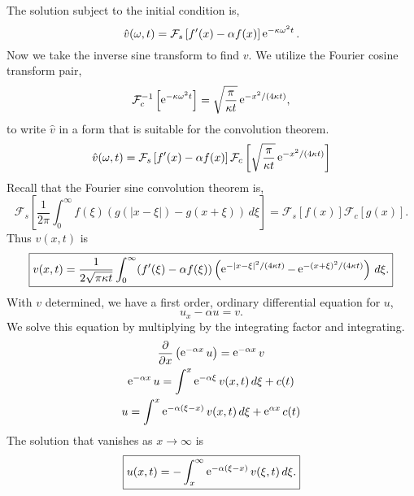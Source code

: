 {\begin{Solution}
  The solution subject to the initial condition is,
  \[
  \hat{v}(\omega,t) = \mathcal{F}_s \left[ f'(x) - \alpha f(x) \right]
  \mathop{\mathrm{e}}\nolimits^{-\kappa \omega^2 t}.
  \]
  Now we take the inverse sine transform to find $v$.  We utilize the Fourier
  cosine transform pair,
  \[
  \mathcal{F}_c^{-1} \left[ \mathop{\mathrm{e}}\nolimits^{- \kappa \omega^2 t } \right]
  = \sqrt{ \frac{\pi}{\kappa t} } \mathop{\mathrm{e}}\nolimits^{- x^2 / (4 \kappa t) },
  \]
  to write $\hat{v}$ in a form that is suitable for the convolution theorem.
  \[
  \hat{v}(\omega,t) = \mathcal{F}_s \left[ f'(x) - \alpha f(x) \right]
  \mathcal{F}_c \left[ \sqrt{ \frac{\pi}{\kappa t} } 
    \mathop{\mathrm{e}}\nolimits^{- x^2 / (4 \kappa t) } \right]
  \]
  Recall that the Fourier sine convolution theorem is,
  \[
  \mathcal{F}_s \left[ \frac{1}{2\pi} \int_0^\infty f(\xi) \left( g(|x-\xi|) 
      - g(x+\xi) \right) \,d \xi \right] 
  = \mathcal{F}_s [f(x)] \mathcal{F}_c [g(x)].
  \]
  Thus $v(x,t)$ is
  \[
  \boxed{
    v(x,t) = \frac{1}{2 \sqrt{ \pi \kappa t } } \int_0^\infty (f'(\xi) - \alpha f(\xi))
    \left( \mathop{\mathrm{e}}\nolimits^{- |x-\xi|^2 / (4 \kappa t) }
      - \mathop{\mathrm{e}}\nolimits^{- (x+\xi)^2 / (4 \kappa t) } \right) \,d \xi.
    }
  \]
  With $v$ determined, we have a first order, ordinary differential equation 
  for $u$,
  \[
  u_x - \alpha u = v.
  \]
  We solve this equation by multiplying by the integrating factor and 
  integrating.
  \begin{gather*}
    \frac{\partial}{\partial x} \left( \mathop{\mathrm{e}}\nolimits^{-\alpha x} u \right) = \mathop{\mathrm{e}}\nolimits^{- \alpha x} v \\
    \mathop{\mathrm{e}}\nolimits^{-\alpha x} u = \int^x \mathop{\mathrm{e}}\nolimits^{-\alpha \xi} v(x,t) \,d\xi + c(t) \\
    u = \int^x \mathop{\mathrm{e}}\nolimits^{-\alpha (\xi - x)} v(x,t) \,d\xi + \mathop{\mathrm{e}}\nolimits^{\alpha x} c(t) 
  \end{gather*}
  The solution that vanishes as $x \to \infty$ is
  \[
  \boxed{
    u(x,t) = - \int_x^\infty \mathop{\mathrm{e}}\nolimits^{- \alpha (\xi - x) } v(\xi, t) \,d \xi.
    }
  \]
\end{Solution}



}
